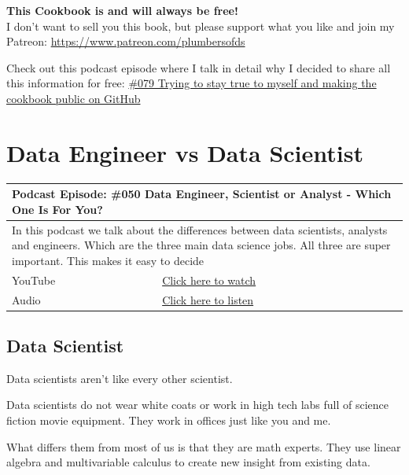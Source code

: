 \documentclass[12pt, numbers=noenddot]{scrreprt} %
\begin{document}
\textbf{This Cookbook is and will always be free! }\\
I don't want to sell you this book, but please support what you like and join my Patreon: \url{https://www.patreon.com/plumbersofds}

Check out this podcast episode where I talk in detail why I decided to share all this information for free:
\href{https://youtu.be/k1bS5aSPos8}{\#079 Trying to stay true to myself and making the cookbook public on GitHub}

\pagebreak

\chapter{Data Engineer vs Data Scientist}

\begin{table}[h]
\begin{tabular}{ll}
\hline
\multicolumn{2}{l}{\textbf{Podcast Episode:} \#050 Data Engineer, Scientist or Analyst - Which One Is For You?} \\ \hline
\multicolumn{2}{p{15cm}}{In this podcast we talk about the differences between data scientists, analysts and engineers. Which are the three main data science jobs. All three are super important. This makes it easy to decide}         \\ \hline
\multicolumn{1}{l|}{YouTube}   & \href{https://youtu.be/64TYZETOEdQ}{Click here to watch}   \\
\multicolumn{1}{l|}{Audio}     & \href{https://anchor.fm/andreaskayy/episodes/050-Data-Engineer-Scientist-or-Analyst-Which-One-Is-For-You-e45ibl}{Click here to listen}   \\ \hline
\end{tabular}
\end{table}

\section{Data Scientist}
Data scientists aren’t like every other scientist.

Data scientists do not wear white coats or work in high tech labs full of science fiction movie equipment. They work in offices just like you and me.

What differs them from most of us is that they are math experts. They use linear algebra and multivariable calculus to create new insight from existing data.
\end{document}
